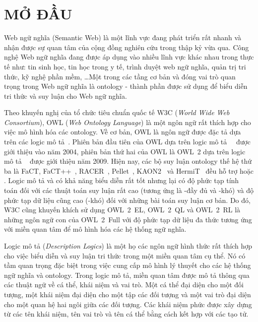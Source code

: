 \chapter*{MỞ ĐẦU}
\label{ChapterMoDau}
\thispagestyle{fancy}

Web ngữ nghĩa (Semantic Web) là một lĩnh vực đang phát triển rất nhanh và nhận được sự quan tâm của cộng đồng nghiên cứu trong thập kỷ vừa qua. Công nghệ Web ngữ nghĩa đang được áp dụng vào nhiều lĩnh vực khác nhau trong thực tế như: tin
sinh học, tin học trong y tế, trình duyệt web ngữ nghĩa, quản trị tri thức, kỹ nghệ phần mềm, \ldots\;Một trong các tầng cơ bản và đóng vai trò quan trọng trong Web ngữ nghĩa là ontology - thành phần được sử dụng để biểu diễn tri thức và suy luận cho Web ngữ nghĩa.

Theo khuyến nghị của tổ chức tiêu chuẩn quốc tế W3C ({\em World Wide Web Consortium}), OWL ({\em Web Ontology Language}) là một ngôn ngữ rất thích hợp cho việc mô hình hóa các ontology. Về cơ bản, OWL là ngôn ngữ được đặc tả dựa trên các logic mô tả~\cite{Horrocks2005,Horrocks2006,Horrocks2007}.
Phiên bản đầu tiên của OWL dựa trên logic mô tả~\SHOIQ~\cite{Horrocks2005, Horrocks2007} được giới thiệu vào năm 2004, phiên bản thứ hai của OWL là OWL~2 dựa trên logic mô tả \SROIQ~\cite{Horrocks2006} được giới thiệu năm 2009. Hiện nay, các bộ suy luận ontology thế hệ thứ ba là FaCT, FaCT++~\cite{Horrocks2003}, RACER~\cite{Haarslev2000}, Pellet~\cite{Sirin2004}, KAON2~\cite{Motik2006} và HermiT~\cite{Horrocks2012} đều hỗ trợ \SHOIQ hoặc \SROIQ. Logic mô tả \SHOIQ và \SROIQ có khả năng biểu diễn rất tốt nhưng lại có độ phức tạp tính toán đối với các thuật toán suy luận rất cao (tương ứng là \NEXPTIME-đầy đủ và \NEXPTIME-khó) và độ phức tạp dữ liệu cũng cao (\NP-khó) đối với những bài toán suy luận cơ bản. Do đó, W3C cũng khuyến khích sử dụng OWL~2~EL, OWL~2~QL và OWL~2~RL là những ngôn ngữ con của OWL~2~Full với độ phức tạp dữ liệu đa thức tương ứng với miền quan tâm để mô hình hóa các hệ thống ngữ nghĩa.

Logic mô tả ({\em Description Logics}) là một họ các ngôn ngữ hình thức rất thích hợp cho việc biểu diễn và suy luận tri thức trong một miền quan tâm cụ thể. Nó có tầm quan trọng đặc biệt trong việc cung cấp mô hình lý thuyết cho các hệ thống ngữ nghĩa và ontology. Trong logic mô tả, miền quan tâm được mô tả thông qua các thuật ngữ về cá thể, khái niệm và vai trò. Một cá thể đại diện cho một đối tượng, một khái niệm đại diện cho một tập các đối tượng và một vai trò đại diện cho một quan hệ hai ngôi giữa các đối tượng. Các khái niệm phức được xây dựng từ các tên khái niệm, tên vai trò và tên cá thể bằng cách kết hợp với các tạo tử.

